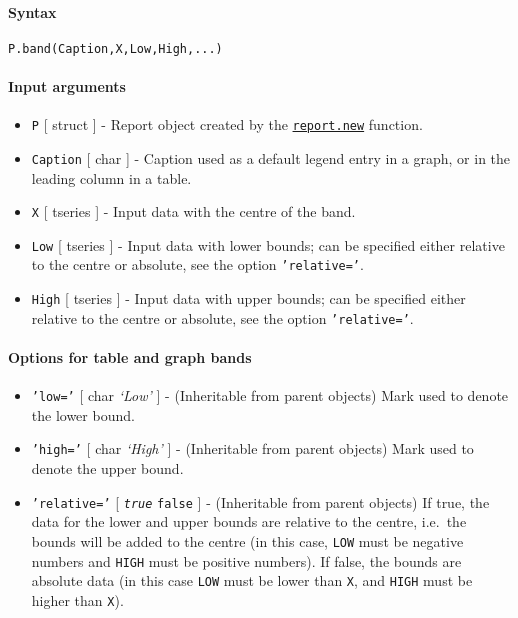


	\paragraph{Syntax}

\begin{verbatim}
P.band(Caption,X,Low,High,...)
\end{verbatim}

\paragraph{Input arguments}

\begin{itemize}
\item
  \texttt{P} {[} struct {]} - Report object created by the
  \href{report/new}{\texttt{report.new}} function.
\item
  \texttt{Caption} {[} char {]} - Caption used as a default legend entry
  in a graph, or in the leading column in a table.
\item
  \texttt{X} {[} tseries {]} - Input data with the centre of the band.
\item
  \texttt{Low} {[} tseries {]} - Input data with lower bounds; can be
  specified either relative to the centre or absolute, see the option
  \texttt{'relative='}.
\item
  \texttt{High} {[} tseries {]} - Input data with upper bounds; can be
  specified either relative to the centre or absolute, see the option
  \texttt{'relative='}.
\end{itemize}

\paragraph{Options for table and graph
bands}

\begin{itemize}
\item
  \texttt{'low='} {[} char \textbar{} \emph{`Low'} {]} - (Inheritable
  from parent objects) Mark used to denote the lower bound.
\item
  \texttt{'high='} {[} char \textbar{} \emph{`High'} {]} - (Inheritable
  from parent objects) Mark used to denote the upper bound.
\item
  \texttt{'relative='} {[} \emph{\texttt{true}} \textbar{}
  \texttt{false} {]} - (Inheritable from parent objects) If true, the
  data for the lower and upper bounds are relative to the centre,
  i.e.~the bounds will be added to the centre (in this case,
  \texttt{LOW} must be negative numbers and \texttt{HIGH} must be
  positive numbers). If false, the bounds are absolute data (in this
  case \texttt{LOW} must be lower than \texttt{X}, and \texttt{HIGH}
  must be higher than \texttt{X}).
\end{itemize}

